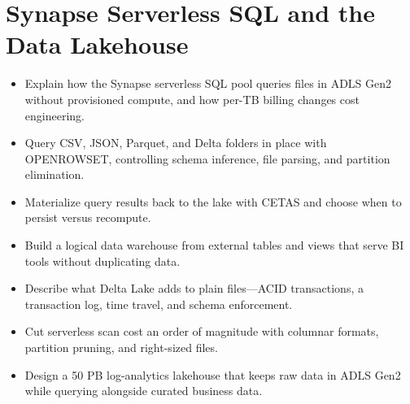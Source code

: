 \chapter{Synapse Serverless SQL and the Data Lakehouse}
%
\begin{objectives}
\begin{itemize}
    \item Explain how the Synapse serverless SQL pool queries files in ADLS Gen2 without provisioned compute, and how per-TB billing changes cost engineering.
    \item Query CSV, JSON, Parquet, and Delta folders in place with OPENROWSET, controlling schema inference, file parsing, and partition elimination.
    \item Materialize query results back to the lake with CETAS and choose when to persist versus recompute.
    \item Build a logical data warehouse from external tables and views that serve BI tools without duplicating data.
    \item Describe what Delta Lake adds to plain files---ACID transactions, a transaction log, time travel, and schema enforcement.
    \item Cut serverless scan cost an order of magnitude with columnar formats, partition pruning, and right-sized files.
    \item Design a 50 PB log-analytics lakehouse that keeps raw data in ADLS Gen2 while querying alongside curated business data.
\end{itemize}
\end{objectives}


